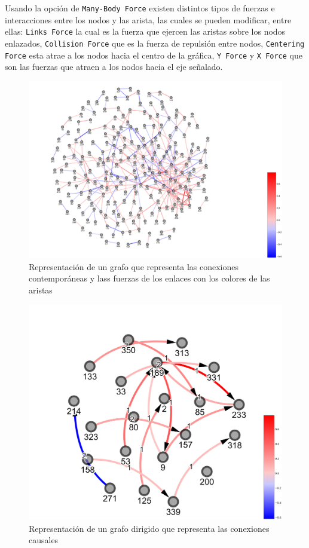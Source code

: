 \documentclass[a4paper,10pt,twocolumn]{article}
\begin{document}
Usando la opción de \texttt{Many-Body Force} existen distintos tipos de fuerzas e interacciones entre los nodos y las arista,
las cuales se pueden modificar, entre ellas: \texttt{Links Force} la cual es la fuerza que ejercen las aristas sobre los nodos
enlazados, \texttt{Collision Force} que es la fuerza de repulsión entre nodos, \texttt{Centering Force} esta atrae a los nodos hacia el centro de la gráfica, \texttt{Y Force} y \texttt{X Force} que son las fuerzas que atraen a los nodos hacia el eje señalado.\\

\begin{figure}[h!]%
\includegraphics[scale=0.05]{graph_colorbar.jpg}
\caption{Representación de un grafo que representa las conexiones contemporáneas y lass fuerzas de los enlaces con los colores de las aristas}
\end{figure}


\begin{figure}[h!]%
\includegraphics[scale=0.1]{digraph_colorbar.jpg}
\caption{Representación de un grafo dirigido que representa las conexiones causales}
\end{figure}
\end{document}
